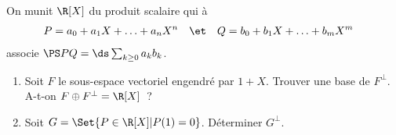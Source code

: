 \begin{enonce}
\begin{exercise}[ID={RMS123 E980, TPE PSI},subtitle={},tags={}]
On munit $\R[X]$ du produit scalaire qui à
\begin{align*}
P&=a_0+a_1X+\dotsc+a_n X^n&
&\et&
Q&=b_0+b_1X+\dotsc+b_mX^m
\end{align*}
associe
\begin{math}
  \PS PQ = 
  \ds\sum_{k\geq 0} a_k b_k
\end{math}.
\begin{enumerate}
  \item Soit $F$ le sous-espace vectoriel engendré par $1+X$. Trouver une base de $F^\perp$. A-t-on $F\oplus F^\perp=\R[X]$~?
  \item Soit $G=\Set{P\in\R[X]| P(1)=0}$. Déterminer $G^\perp$.
\end{enumerate}
\end{exercise}
\begin{solution}
\end{solution}
\end{enonce}
